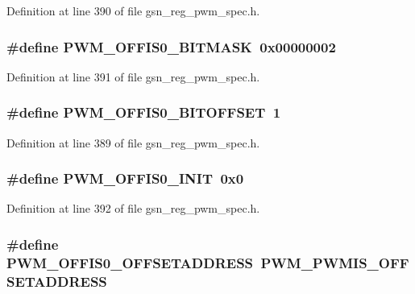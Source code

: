 Definition at line 390 of file gsn\_\-reg\_\-pwm\_\-spec.h.

\hypertarget{a00565_a174cd7955e1bb617fb16f705d9e18a2f}{
\subsubsection[{PWM\_\-OFFIS0\_\-BITMASK}]{\setlength{\rightskip}{0pt plus 5cm}\#define PWM\_\-OFFIS0\_\-BITMASK~0x00000002}}
\label{a00565_a174cd7955e1bb617fb16f705d9e18a2f}


Definition at line 391 of file gsn\_\-reg\_\-pwm\_\-spec.h.

\hypertarget{a00565_a15a384ea0630b9925a7d363eeac6dde5}{
\subsubsection[{PWM\_\-OFFIS0\_\-BITOFFSET}]{\setlength{\rightskip}{0pt plus 5cm}\#define PWM\_\-OFFIS0\_\-BITOFFSET~1}}
\label{a00565_a15a384ea0630b9925a7d363eeac6dde5}


Definition at line 389 of file gsn\_\-reg\_\-pwm\_\-spec.h.

\hypertarget{a00565_a34d2488e01033e09e389b8e725084bb8}{
\subsubsection[{PWM\_\-OFFIS0\_\-INIT}]{\setlength{\rightskip}{0pt plus 5cm}\#define PWM\_\-OFFIS0\_\-INIT~0x0}}
\label{a00565_a34d2488e01033e09e389b8e725084bb8}


Definition at line 392 of file gsn\_\-reg\_\-pwm\_\-spec.h.

\hypertarget{a00565_ad776527b5c972a73cdb17fcfa7facf79}{
\subsubsection[{PWM\_\-OFFIS0\_\-OFFSETADDRESS}]{\setlength{\rightskip}{0pt plus 5cm}\#define PWM\_\-OFFIS0\_\-OFFSETADDRESS~PWM\_\-PWMIS\_\-OFFSETADDRESS}}
\label{a00565_ad776527b5c972a73cdb17fcfa7facf79}


